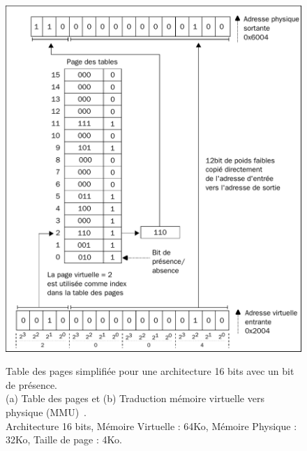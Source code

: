 \documentclass[8pt]{beamer}
\begin{document}
\begin{frame}
\begin{figure}
\begin{minipage}[b]{0.5\linewidth}
            \includegraphics[width=.95\linewidth]{figures/page_mapping.pdf}
            \subcaption{}
            \label{fig:page_mapping}
        \end{minipage}
        \caption{Table des pages simplifiée pour une architecture 16 bits avec
            un bit de
            pr\'esence. \\ (a) Table des pages et (b) Traduction mémoire
            virtuelle vers
            physique (MMU)~\cite{tanenbaum2009modern}. \\
            Architecture 16 bits,
            Mémoire Virtuelle : 64Ko, Mémoire Physique : 32Ko,
            Taille de page : 4Ko. \\
        }
    \end{figure}

\end{frame}
\end{document}
